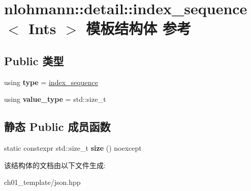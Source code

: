 \hypertarget{structnlohmann_1_1detail_1_1index__sequence}{}\section{nlohmann\+::detail\+::index\+\_\+sequence$<$ Ints $>$ 模板结构体 参考}
\label{structnlohmann_1_1detail_1_1index__sequence}
\subsection*{Public 类型}
\begin{DoxyCompactItemize}
\item 
\mbox{\label{structnlohmann_1_1detail_1_1index__sequence_a3c14c4ab277de72b166806193ff4fa10}} 
using {\bfseries type} = \mbox{\hyperlink{structnlohmann_1_1detail_1_1index__sequence}{index\+\_\+sequence}}
\item 
\mbox{\label{structnlohmann_1_1detail_1_1index__sequence_a2eca43d08fc1eb68bd5fa75b6714d21d}} 
using {\bfseries value\+\_\+type} = std\+::size\+\_\+t
\end{DoxyCompactItemize}
\subsection*{静态 Public 成员函数}
\begin{DoxyCompactItemize}
\item 
\mbox{\label{structnlohmann_1_1detail_1_1index__sequence_a7ac529419787d775f52408135304b337}} 
static constexpr std\+::size\+\_\+t {\bfseries size} () noexcept
\end{DoxyCompactItemize}


该结构体的文档由以下文件生成\+:\begin{DoxyCompactItemize}
\item 
ch01\+\_\+template/json.\+hpp\end{DoxyCompactItemize}
